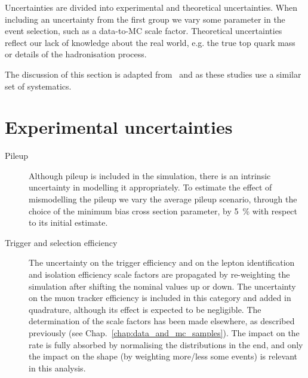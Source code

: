Uncertainties are divided into experimental and theoretical uncertainties. When including an uncertainty from the first group we vary some parameter in the event selection, such as a data-to-MC scale factor. Theoretical uncertainties reflect our lack of knowledge about the real world, e.g. the true top quark mass or details of the hadronisation process.

The discussion of this section is adapted from~\cite{CMS-AN-2017-175} and \cite{CMS-AN-2017-159} as these studies use a similar set of systematics.

\section{Experimental uncertainties}
\begin{description}

\item[Pileup] Although pileup is included in the simulation, there is an intrinsic uncertainty in modelling it appropriately. To estimate the effect of mismodelling the pileup we vary the average pileup scenario, through the choice of the minimum bias cross section parameter, by 5~\% with respect to its initial estimate. 

\item[Trigger and selection efficiency] The uncertainty on the trigger efficiency and on the lepton identification and isolation efficiency scale factors are propagated by re-weighting the simulation after shifting the nominal values up or down. The uncertainty on the muon tracker efficiency is included in this category and added in quadrature, although its effect is expected to be negligible.  The determination of the scale factors has been made elsewhere, as described previously (see Chap.~\ref{chap:data_and_mc_samples}). The impact on the rate is fully absorbed by normalising the distributions in the end, and only the impact on the shape (by weighting more/less some events) is relevant in this analysis.



\end{description}

